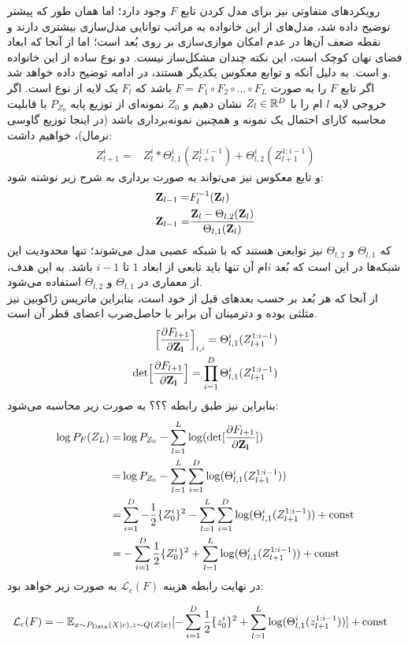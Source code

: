 رویکرد‌های متفاوتی نیز برای مدل کردن تابع $F$ وجود دارد؛ اما  همان طور که پیشتر توضیح داده شد، مدل‌های \autoregressive{} از این خانواده به مراتب توانایی مدل‌سازی بیشتری دارند و نقطه ضعف آن‌ها در عدم امکان موازی‌سازی بر روی بُعد است؛ اما از آنجا که ابعاد فضای نهان کوچک است، این نکته چندان مشکل‌ساز نیست. دو نوع ساده از این خانواده  و   است. به دلیل آنکه  و  توابع معکوس یکدیگر هستند،  در ادامه توضیح داده خواهد شد.
\\
اگر تابع $F$ را به صورت $F = F_1 \circ F_2 \circ ... \circ F_L$ باشد که $F_l$ یک لایه از نوع  است. اگر خروجی لایه $l$ ام را با $Z_l \in {\mathbb{R}}^D$ نشان دهیم و $Z_0$ نمونه‌ای از توزیع پایه  $P_{Z_0}$ با قابلیت محاسبه کارای احتمال یک نمونه و همچنین نمونه‌برداری باشد (در اینجا توزیع گاوسی نرمال)، خواهیم داشت:
\begin{align}
	Z^i_{l+1} = & Z^i_{l} * \Theta^{i}_{l,1}(Z^{1:i-1}_{l+1}) + \Theta^{i}_{l,2}(Z^{1:i-1}_{l+1})
\end{align}
و تابع معکوس نیز می‌تواند به صورت برداری به شرح زیر نوشته شود:
\begin{align}
	{\bf Z}_{l-1} =  & F_{l}^{-1}({\bf Z}_{l}) \nonumber
	\\
	{\bf  Z}_{l-1} = &
	\frac{{\bf  Z}_{l} - \Theta_{l,2}({\bf Z}_{l})}
	{\Theta_{l,1}({\bf Z}_{l})}
\end{align}
که $\Theta_{l,1}$ و $\Theta_{l,2}$ نیز توابعی هستند که با شبکه عصبی مدل می‌شوند؛ تنها محدودیت این شبکه‌ها در این است که بُعد $i$ام آن تنها باید تابعی از ابعاد $1$ تا $i-1$ باشد. به این هدف، از معماری  در $\Theta_{l,1}$ و $\Theta_{l,2}$ استفاده می‌شود.
\\
از آنجا که هر بُعد بر حسب بعدهای قبل از خود است، بنابراین ماتریس ژاکوبین نیز مثلثی بوده و دترمینان آن برابر با حاصل‌ضرب اعضای قطر آن است.
\begin{align}
	\Big[ \frac{\partial F_{l+1}}{\partial {\bf Z_l}} \Big]_{i,i} = \Theta^{i}_{l,1}(Z^{1:i-1}_{l+1}) \nonumber
	\\
	\text{det}\Big[ \frac{\partial F_{l+1}}{\partial{\bf Z_l}} \Big] = \prod_{i=1}^D \Theta^{i}_{l,1}(Z^{1:i-1}_{l+1})
\end{align}
بنابراین \likelihood{} نیز طبق رابطه ؟؟؟ به صورت زیر محاسبه می‌شود:
\begin{align}
	\log P_F(Z_L) = & \log P_{Z_0} - \sum_{l=1}^L \log (\text{det}[    \frac{\partial F_{l+1}}{\partial {\bf Z_l}}     ]) \nonumber
	\\
	=               & \log P_{Z_0} - \sum_{l=1}^L \sum_{i=1}^D \log (\Theta^{i}_{l,1}(Z^{1:i-1}_{l+1})) \nonumber
	\\
	=               & \sum_{i=1}^D -\frac{1}{2} \{Z^i_0\}^2 - \sum_{l=1}^L \sum_{i=1}^D \log (\Theta^{i}_{l,1}(Z^{1:i-1}_{l+1})) + \text{const} \nonumber
	\\
	=               & -\sum_{i=1}^D \frac{1}{2} \{Z^i_0\}^2 + \sum_{l=1}^L \log (\Theta^{i}_{l,1}(Z^{1:i-1}_{l+1})) + \text{const}
\end{align}
در نهایت رابطه هزینه $\mathcal{L}_c (F)$ به صورت زیر خواهد بود:

\begin{align}
	\mathcal{L}_c (F) = & - \mathbb E_{x \sim P_\text{Data}(X|c), z \sim Q(Z|x)} [-\sum_{i=1}^D \frac{1}{2} \{z^i_0\}^2 + \sum_{l=1}^L \log (\Theta^{i}_{l,1}(z^{1:i-1}_{l+1}))] + \text{const}
\end{align}
